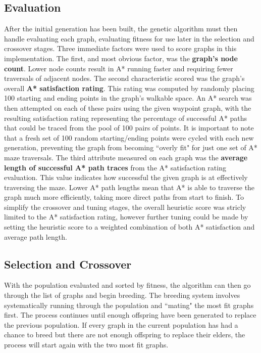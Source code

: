 	\subsection{Evaluation}
	After the initial generation has been built, the genetic algorithm must then handle evaluating each graph, evaluating fitness for use later in the selection and crossover stages. Three immediate factors were used to score graphs in this implementation. The first, and most obvious factor, was the \textbf{graph's node count}. Lower node counts result in A* running faster and requiring fewer traversals of adjacent nodes. The second characteristic scored was the graph's overall \textbf{A* satisfaction rating}. This rating was computed by randomly placing 100 starting and ending points in the graph's walkable space. An A* search was then attempted on each of these pairs using the given waypoint graph, with the resulting satisfaction rating representing the percentage of successful A* paths that could be traced from the pool of 100 pairs of points. It is important to note that a fresh set of 100 random starting/ending points were cycled with each new generation, preventing the graph from becoming ``overly fit" for just one set of A* maze traversals. The third attribute measured on each graph was the \textbf{average length of successful A* path traces} from the A* satisfaction rating evaluation. This value indicates how successful the given graph is at effectively traversing the maze. Lower A* path lengths mean that A* is able to traverse the graph much more efficiently, taking more direct paths from start to finish. To simplify the crossover and tuning stages, the overall heuristic score was stricly limited to the A* satisfaction rating, however further tuning could be made by setting the heuristic score to a weighted combination of both A* satisfaction and average path length.
	
	\subsection{Selection and Crossover}
	With the population evaluated and sorted by fitness, the algorithm can then go through the list of graphs and begin breeding. The breeding system involves systematically running through the population and ``mating" the most fit graphs first. The process continues until enough offspring have been generated to replace the previous population. If every graph in the current population has had a chance to breed but there are not enough offspring to replace their elders, the process will start again with the two most fit graphs.
	
